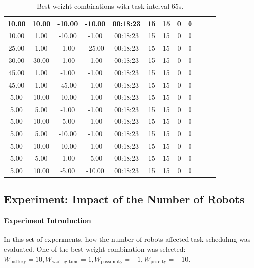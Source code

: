 \begin{table}[htb]
{\begin{tabular}{|c|c|c|c|c|c|c|c|c|c|c|c|}
10.00   & 10.00    & -10.00  & -10.00  & 00:18:23 & 15    & 15  & 0  & 0    \\ \hline
10.00   & 1.00     & -10.00  & -1.00   & 00:18:23 & 15    & 15  & 0  & 0    \\ \hline
25.00   & 1.00     & -1.00   & -25.00  & 00:18:23 & 15    & 15  & 0  & 0    \\ \hline
30.00   & 30.00    & -1.00   & -1.00   & 00:18:23 & 15    & 15  & 0  & 0    \\ \hline
45.00   & 1.00     & -1.00   & -1.00   & 00:18:23 & 15    & 15  & 0  & 0    \\ \hline
45.00   & 1.00     & -45.00  & -1.00   & 00:18:23 & 15    & 15  & 0  & 0    \\ \hline
5.00    & 10.00    & -10.00  & -1.00   & 00:18:23 & 15    & 15  & 0  & 0    \\ \hline
5.00    & 5.00     & -1.00   & -1.00   & 00:18:23 & 15    & 15  & 0  & 0   \\ \hline
5.00    & 10.00    & -5.00   & -1.00   & 00:18:23 & 15    & 15  & 0  & 0    \\ \hline
5.00    & 5.00     & -10.00  & -1.00   & 00:18:23 & 15    & 15  & 0  & 0   \\ \hline
5.00    & 10.00    & -10.00  & -1.00   & 00:18:23 & 15    & 15  & 0  & 0    \\ \hline
5.00    & 5.00     & -1.00   & -5.00   & 00:18:23 & 15    & 15  & 0  & 0    \\ \hline
5.00    & 10.00    & -5.00   & -10.00  & 00:18:23 & 15    & 15  & 0  & 0    \\ \hline
\end{tabular}}
\caption{Best weight combinations with task interval 65s.}
\label{tab:exp_task_65s}
\end{table}


\subsection{Experiment: Impact of the Number of Robots}

\paragraph{Experiment Introduction} 
In this set of experiments, how the number of robots affected task scheduling was evaluated. One of the best weight combination was selected: $ W_{\mbox{battery}} = 10,W_{\mbox{waiting time}} = 1,  W_{\mbox{possibility}} = -1, W_{\mbox{priority}} = -10 $. 
    
